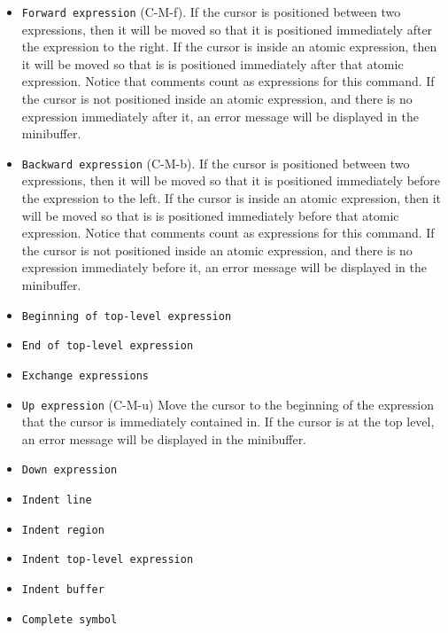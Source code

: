 \begin{itemize}
\item \texttt{Forward expression} (C-M-f).  If the cursor is
  positioned between two expressions, then it will be moved so that it
  is positioned immediately after the expression to the right.  If the
  cursor is inside an atomic expression, then it will be moved so that
  is is positioned immediately after that atomic expression.  Notice
  that comments count as expressions for this command.  If the cursor
  is not positioned inside an atomic expression, and there is no
  expression immediately after it, an error message will be displayed
  in the minibuffer.
\item \texttt{Backward expression} (C-M-b).  If the cursor is
  positioned between two expressions, then it will be moved so that it
  is positioned immediately before the expression to the left.  If the
  cursor is inside an atomic expression, then it will be moved so that
  is is positioned immediately before that atomic expression.  Notice
  that comments count as expressions for this command.  If the cursor
  is not positioned inside an atomic expression, and there is no
  expression immediately before it, an error message will be displayed
  in the minibuffer.
\item \texttt{Beginning of top-level expression}
\item \texttt{End of top-level expression}
\item \texttt{Exchange expressions}
\item \texttt{Up expression} (C-M-u) Move the cursor to the beginning
  of the expression that the cursor is immediately contained in.  If
  the cursor is at the top level, an error message will be displayed
  in the minibuffer.
\item \texttt{Down expression}
\item \texttt{Indent line}
\item \texttt{Indent region}
\item \texttt{Indent top-level expression}
\item \texttt{Indent buffer}
\item \texttt{Complete symbol}
\end{itemize}

